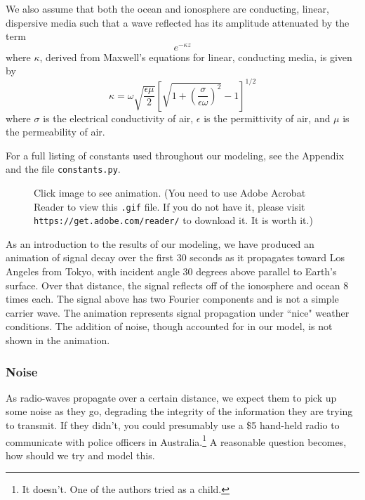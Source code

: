 \documentclass[11pt]{article}
\numberwithin{equation}{section}
\begin{document}
\par We also assume that both the ocean and ionosphere are conducting, linear, dispersive media such that a wave reflected has its amplitude attenuated by the term
\[
e^{-\kappa z}
\]
where $\kappa$, derived from Maxwell's equations for linear, conducting media\cite{griffiths2005}, is given by
\begin{equation}
\kappa = \omega \sqrt{\frac{\epsilon\mu}{2}}\left[ \sqrt{1 + \left( \frac{\sigma}{\epsilon\omega} \right)^2} - 1 \right]^{1/2}
\end{equation}
where $\sigma$ is the electrical conductivity of air, $\epsilon$ is the permittivity of air, and $\mu$ is the permeability of air.
\par For a full listing of constants used throughout our modeling, see the Appendix and the file \verb|constants.py|.

 \begin{figure}
     \begin{center}
     \end{center}
     \caption{ Click image to see animation. (You need to use Adobe Acrobat Reader to view this \texttt{.gif} file. If you do not have it, please visit \texttt{https://get.adobe.com/reader/} to download it. It is worth it.)}
 \end{figure}
 
As an introduction to the results of our modeling, we have produced an animation of signal decay over the first 30 seconds as it propagates toward Los Angeles from Tokyo, with incident angle 30 degrees above parallel to Earth's surface. Over that distance, the signal reflects off of the ionosphere and ocean 8 times each. The signal above has two Fourier components and is not a simple carrier wave. The animation represents signal propagation under ``nice" weather conditions. The addition of noise, though accounted for in our model, is not shown in the animation. 

\subsubsection{Noise} %
\label{ssub:noise}

As radio-waves propagate over a certain distance, we expect them to pick up some noise as they go, degrading the integrity of the information they are trying to transmit. If they didn't, you could presumably use a \$5 hand-held radio to communicate with police officers in Australia.\footnote{It doesn't. One of the authors tried as a child.} A reasonable question becomes, how should we try and model this.
\end{document}
